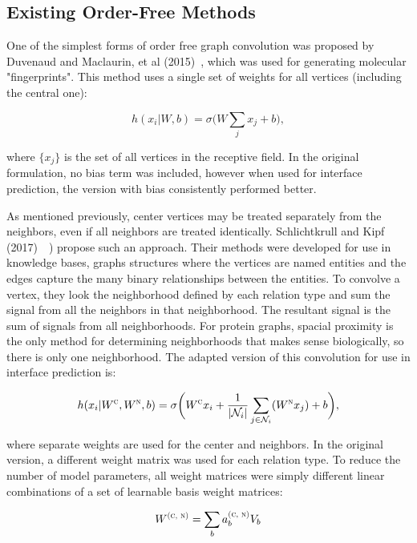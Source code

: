 \subsection{Existing Order-Free Methods}
One of the simplest forms of order free graph convolution was proposed by Duvenaud and Maclaurin, et al (2015)~\cite{duvenaud2015}, which was used for generating molecular "fingerprints".
This method uses a single set of weights for all vertices (including the central one):

\begin{equation}
h(x_i | W, b)= \sigma \bigg( W \sum_{j}x_j + b\bigg),
\label{eq:fingerprint}
\end{equation}

\noindent
where $\{x_j\}$ is the set of all vertices in the receptive field.
In the original formulation, no bias term was included, however when used for interface prediction, the version with bias consistently performed better.

As mentioned previously, center vertices may be treated separately from the neighbors, even if all neighbors are treated identically. 
Schlichtkrull and Kipf (2017)~~\cite{schlichtkrull2017}) propose such an approach.
Their methods were developed for use in knowledge bases, graphs structures where the vertices are named entities and the edges capture the many binary relationships between the entities. 
To convolve a vertex, they look the neighborhood defined by each relation type and sum the signal from all the neighbors in that neighborhood.
The resultant signal is the sum of signals from all neighborhoods.
For protein graphs, spacial proximity is the only method for determining neighborhoods that makes sense biologically, so there is only one neighborhood.
The adapted version of this convolution for use in interface prediction is:

\begin{equation}
h(x_i | W^\textsc{c}, W^\textsc{n}, b)= \sigma \bigg( W^\textsc{c} x_i + \frac{1}{|\mathcal{N}_i|} \sum_{j \in \mathcal{N}_i}(W^\textsc{n} x_j)  + b\bigg),
\label{eq:rgcn}
\end{equation}

\noindent
where separate weights are used for the center and neighbors. 
In the original version, a different weight matrix was used for each relation type.  
To reduce the number of model parameters, all weight matrices were simply different linear combinations of a set of learnable basis weight matrices:

\begin{equation}
W^\textsc{(c, n)} = \sum_{b} a^\textsc{(c, n)}_b V_b 
\label{eq:rgcn_basis}
\end{equation}

